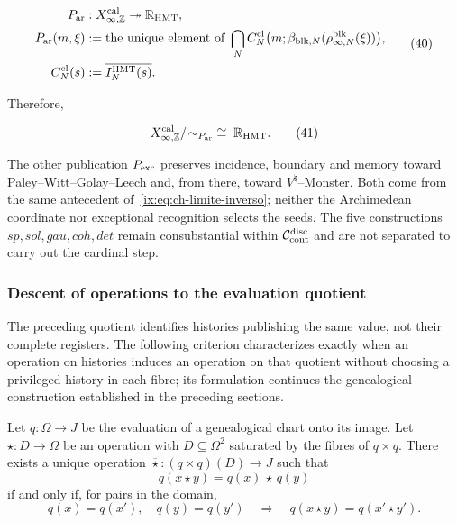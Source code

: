 \[
\begin{aligned}
 P_{\rm ar}&:X_{\infty,\mathbb Z}^{\rm cal}
     \twoheadrightarrow\mathbb R_{\rm HMT},\\
 P_{\rm ar}(m,\xi)
   &:=\text{the unique element of }
     \bigcap_N C_N^{\rm cl}
       \bigl(m;\beta_{{\rm blk},N}(\rho^{\rm blk}_{\infty,N}(\xi))\bigr),\\
 C_N^{\rm cl}(s)&:=\overline{I_N^{\rm HMT}(s)}.
\end{aligned}
\tag{40}\label{ix:eq:ch-proyeccion-arquimediana}
\]

Therefore,

\[
 X_{\infty,\mathbb Z}^{\rm cal}/\!\sim_{P_{\rm ar}}
 \;\cong\;\mathbb R_{\rm HMT}.
\tag{41}\label{ix:eq:ch-cociente-recta}
\]

The other publication \(P_{\rm exc}\) preserves incidence, boundary and memory
toward Paley--Witt--Golay--Leech and, from there, toward
\(V^\natural\)--Monster. Both come from the
same antecedent of~\eqref{ix:eq:ch-limite-inverso}; neither the Archimedean coordinate nor exceptional
recognition selects the seeds. The five constructions
\(sp,sol,gau,coh,det\) remain consubstantial within
\(\mathcal C_{\rm cont}^{\rm disc}\) and are not separated to carry out the cardinal
step.


\subsubsection{Descent of operations to the evaluation quotient}
\label{ix:sec:ch-descenso-fibras}

The preceding quotient identifies histories publishing the same value, not
their complete registers. The following criterion characterizes exactly
when an operation on histories induces an operation on that quotient without
choosing a privileged history in each fibre; its formulation
continues the genealogical construction established in the preceding sections.

\begin{proposition}
\label{ix:prop:ch-descenso-fibras}
Let \(q:\Omega\to J\) be the evaluation of a genealogical chart
onto its image. Let \(\star:D\to\Omega\) be an operation with
\(D\subseteq\Omega^2\) saturated by the fibres of \(q\times q\).
There exists a unique operation
\(\overline\star:(q\times q)(D)\to J\) such that
\[
 q(x\star y)=q(x)\,\overline\star\,q(y)
\]
if and only if, for pairs in the domain,
\[
 q(x)=q(x'),\quad q(y)=q(y')
 \quad\Longrightarrow\quad q(x\star y)=q(x'\star y').
\]
\end{proposition}

